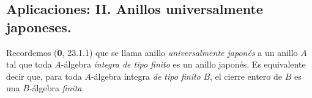 \subsection{Aplicaciones: II. Anillos universalmente japoneses.}
\label{IV.2.ss7.7-fr}

\begin{env}[7.7.1]
\label{IV.2.s7.7.1-fr}
Recordemos (\textbf 0, 23.1.1) que se llama anillo \emph{universalmente japonés} a un
anillo $A$ tal que toda $A$-álgebra \emph{íntegra de tipo finito} es un anillo japonés. Es equivalente decir que, para toda
$A$-álgebra íntegra \emph{de tipo finito} $B$, el cierre
entero de $B$ es una $B$-álgebra \emph{finita}.
\end{env}
